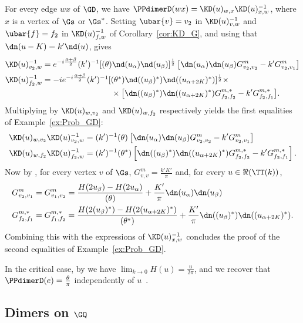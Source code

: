 \documentclass[a4paper,twoside,11pt]{article}
\begin{document}
For every edge $wx$ of $\GD$, we have $\PPdimerD(wx)=\KD(u)_{w,x}\KD(u)^{-1}_{x,w}$,
where $x$ is a vertex of $\Gs$ or $\Gs^*$. Setting $\ubar{v}=v_2$ in $\KD(u)^{-1}_{v,w}$ and $\ubar{f}=f_2$ in $\KD(u)^{-1}_{f,w}$ of
Corollary~\ref{cor:KD_G}, and using that $\dn(u-K)=k'\nd(u)$, gives
\begin{align*}
\KD(u)^{-1}_{v_2,w}&=
e^{-i\frac{\bar{\alpha}+\bar{\beta}}{2}}(k')^{-1}[\sc(\theta)\nd(u_{\alpha})\nd(u_{\beta})]^{\frac{1}{2}}
\left[
\dn(u_{\alpha})\dn(u_{\beta})G^m_{v_2,v_2}-k'G^m_{v_2,v_1}\right]\\
\KD(u)^{-1}_{f_2,w}&\textstyle=
-ie^{-i\frac{\bar{\alpha}+\bar{\beta}}{2}}(k')^{-1}[\sc(\theta^*)\nd((u_{\beta})^*)\nd((u_{\alpha+2K})^*)]^{\frac{1}{2}}\times\\
&\hspace{3cm}\times \bigl[\dn((u_{\beta})^*)\dn((u_{\alpha+2K})^*)G^{m,*}_{f_2,f_2}-k'G^{m,*}_{f_2,f_1}\bigr].
\end{align*}
Multiplying by $\KD(u)_{w,v_2}$ and $\KD(u)_{w,f_2}$ respectively yields the first equalities of Example~\ref{ex:Prob_GD}:
\begin{align*}
\KD(u)_{w,v_2}\KD(u)^{-1}_{v_2,w}&=
(k')^{-1}\sc(\theta)
\left[
\dn(u_{\alpha})\dn(u_{\beta})G^m_{v_2,v_2}-k'G^m_{v_2,v_1}\right]\\
\KD(u)_{w,f_2}\KD(u)^{-1}_{f_2,w}&=
(k')^{-1}\sc(\theta^*)
\left[\dn((u_{\beta})^*)\dn((u_{\alpha+2K})^*)G^{m,*}_{f_2,f_2}-k'G^{m,*}_{f_2,f_1}
\right].
\end{align*}
Now by \cite[Lemma 46]{BdTR1}, for every vertex $v$ of $\Gs$, $G^m_{v,v}=\frac{k'K'}{\pi}$ and, for every $u\in\Re(\TT(k))$, 
\begin{align*}
G^m_{v_2,v_1}&=G^m_{v_1,v_2}=
\frac{H(2u_{\beta})-H(2u_{\alpha})}{\sc(\theta)}+\frac{K'}{\pi}\dn(u_\alpha)\dn(u_\beta)\\
G^{m,*}_{f_2,f_1}&=G^{m,*}_{f_1,f_2}=
\frac{H(2(u_{\beta})^*)-H(2(u_{\alpha+2K})^*)}{\sc(\theta^*)}+\frac{K'}{\pi}\dn((u_\beta)^*)\dn((u_{\alpha+2K})^*).
\end{align*}
Combining this with the expressions of $\KD(u)^{-1}_{x,w}$ concludes the proof of the second equalities of Example~\ref{ex:Prob_GD}.

In the critical case, by \cite[Lemma 45]{BdTR1} we have $\lim_{k\rightarrow 0} H(u)=\frac{u}{2\pi}$, 
and we recover that $\PPdimerD(e)=\frac{\theta}{\pi}$ independently of $u$~\cite{Kenyon3}.


\subsection{Dimers on $\GQ$}\label{app:dimers_GQ}
\end{document}
